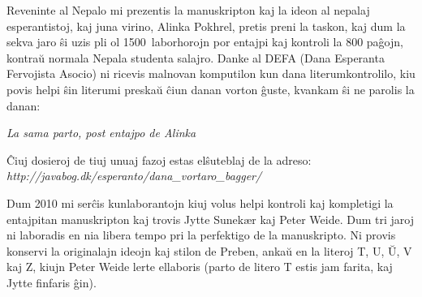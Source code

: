 {\frenchspacing
Reveninte al Nepalo mi prezentis la manuskripton kaj la ideon al nepalaj
esperantistoj, kaj juna virino, Alinka Pokhrel, pretis preni la taskon,
kaj dum la sekva jaro \^si uzis pli ol 1500~laborhorojn por entajpi kaj
kontroli la 800 pa\^gojn, kontra\u{u} normala Nepala studenta salajro.
Danke al DEFA (Dana Esperanta Fervojista Asocio) ni ricevis malnovan
komputilon kun dana literumkontrolilo, kiu povis helpi \^sin literumi
preska\u{u} \^ciun danan vorton \^guste, kvankam \^si ne parolis la
danan:}


\begin{center}

{\itshape La sama parto, post entajpo de Alinka}
\end{center}





{\frenchspacing
\^Ciuj dosieroj de tiuj unuaj fazoj estas el\^suteblaj de la adreso:\\
\textit{http://javabog.dk/esperanto/dana\_vortaro\_bagger/}}

{\frenchspacing
Dum 2010 mi ser\^cis kunlaborantojn kiuj volus helpi kontroli kaj
kompletigi la entajpitan manuskripton kaj trovis Jytte Sunek{\ae}r kaj
Peter Weide. Dum tri jaroj ni laboradis en nia libera tempo pri la
perfektigo de la manuskripto. Ni provis konservi la originalajn ideojn
kaj stilon de Preben, anka\u{u} en la literoj T, U, \u{U}, V kaj Z,
kiujn Peter Weide lerte ellaboris (parto de litero T estis jam farita, kaj Jytte finfaris \^gin).}

